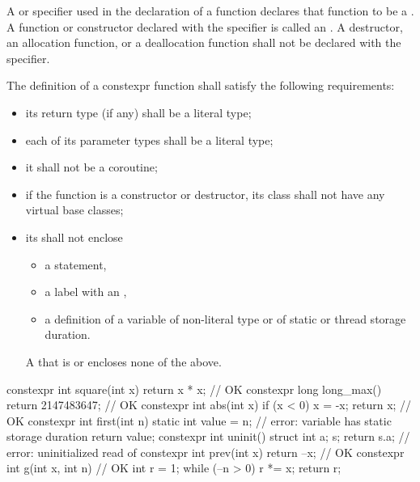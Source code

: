 \pnum
A  or  specifier
used in the declaration of a function
declares that function to be
a .
A function or constructor declared with the  specifier
is called an .
A destructor, an allocation function, or a deallocation function
shall not be declared with the  specifier.

\pnum
{}%
%
The definition of a constexpr function shall satisfy the following
requirements:
\begin{itemize}
\item
its return type (if any) shall be a literal type;

\item
each of its parameter types shall be a literal type;

\item
it shall not be a coroutine;

\item
if the function is a constructor or destructor,
its class shall not have any virtual base classes;

\item
its  shall not enclose
\begin{itemize}
\item a  statement,
\item a label with an ,
\item a definition of a variable
of non-literal type or
of static or thread storage duration.
\end{itemize}
\begin{note}
A  that is  or 
encloses none of the above.
\end{note}
\end{itemize}

\begin{example}
\begin{codeblock}
constexpr int square(int x)
  { return x * x; }             // OK
constexpr long long_max()
  { return 2147483647; }        // OK
constexpr int abs(int x) {
  if (x < 0)
    x = -x;
  return x;                     // OK
}
constexpr int first(int n) {
  static int value = n;         // error: variable has static storage duration
  return value;
}
constexpr int uninit() {
  struct { int a; } s;
  return s.a;                   // error: uninitialized read of 
}
constexpr int prev(int x)
  { return --x; }               // OK
constexpr int g(int x, int n) { // OK
  int r = 1;
  while (--n > 0) r *= x;
  return r;
}
\end{codeblock}
\end{example}

